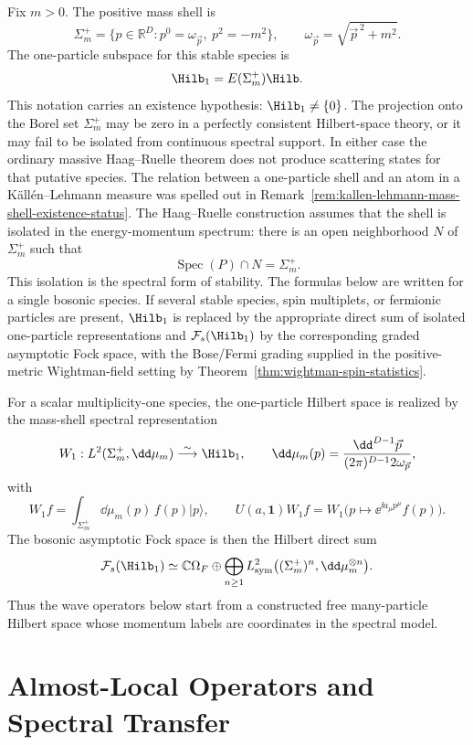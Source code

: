 Fix \(m>0\).  The positive mass shell is
\[
  \Sigma_m^+
  =
  \{p\in\mathbb R^D:p^0=\omega_{\vec p},\ p^2=-m^2\},
  \qquad
  \omega_{\vec p}=\sqrt{\vec p^{\,2}+m^2}.
\]
The one-particle subspace for this stable species is
\[
  \Hilb_1=E(\Sigma_m^+)\Hilb .
\]
This notation carries an existence hypothesis: \(\Hilb_1\ne\{0\}\).  The
projection onto the Borel set \(\Sigma_m^+\) may be zero in a perfectly
consistent Hilbert-space theory, or it may fail to be isolated from continuous
spectral support.  In either case the ordinary massive Haag--Ruelle theorem
does not produce scattering states for that putative species.  The relation
between a one-particle shell and an atom in a K\"all\'en--Lehmann measure was
spelled out in
Remark~\ref{rem:kallen-lehmann-mass-shell-existence-status}.
The Haag--Ruelle construction assumes that the shell is isolated in the
energy-momentum spectrum: there is an open neighborhood \(N\) of
\(\Sigma_m^+\) such that
\[
  \operatorname{Spec}(P)\cap N=\Sigma_m^+ .
\]
This isolation is the spectral form of stability.  The formulas below are
written for a single bosonic species.  If several stable species, spin
multiplets, or fermionic particles are present, \(\Hilb_1\) is replaced by the
appropriate direct sum of isolated one-particle representations and
\(\mathcal F_s(\Hilb_1)\) by the corresponding graded asymptotic Fock space,
with the Bose/Fermi grading supplied in the positive-metric Wightman-field
setting by Theorem~\ref{thm:wightman-spin-statistics}.

For a scalar multiplicity-one species, the one-particle Hilbert space is
realized by the mass-shell spectral representation
\[
  W_1:L^2(\Sigma_m^+,\dd\mu_m)\overset{\sim}{\longrightarrow}\Hilb_1,
  \qquad
  \dd\mu_m(p)=\frac{\dd^{D-1}\vec p}{(2\pi)^{D-1}2\omega_{\vec p}},
\]
with
\[
  W_1 f=\int_{\Sigma_m^+}\dd\mu_m(p)\,f(p)|p\rangle,
  \qquad
  U(a,\mathbf 1)W_1f
  =
  W_1\bigl(p\mapsto \ee^{\ii a_\mu p^\mu}f(p)\bigr).
\]
The bosonic asymptotic Fock space is then the Hilbert direct sum
\[
  \mathcal F_s(\Hilb_1)
  \simeq
  \mathbb C\Omega_F
  \oplus
  \bigoplus_{n\ge1}
  L^2_{\mathrm{sym}}\bigl((\Sigma_m^+)^n,\dd\mu_m^{\otimes n}\bigr).
\]
Thus the wave operators below start from a constructed free many-particle
Hilbert space whose momentum labels are coordinates in the spectral model.

\section{Almost-Local Operators and Spectral Transfer}


